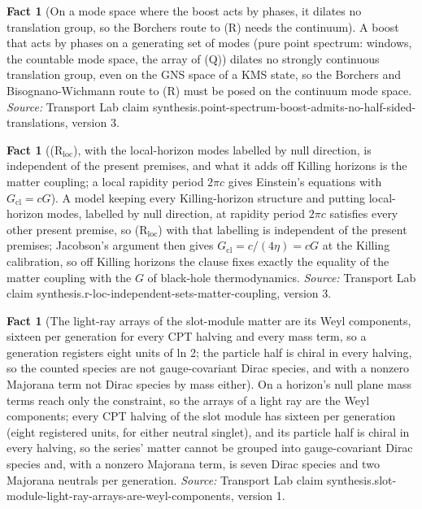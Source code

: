 \documentclass[11pt]{article}
\theoremstyle{definition}
\newtheorem{fact}[theorem]{Fact}
\theoremstyle{plain}
\begin{document}
\begin{fact}[On a mode space where the boost acts by phases, it dilates no translation group, so the Borchers route to (R) needs the continuum]\label{c:synthesis.point-spectrum-boost-admits-no-half-sided-translations}
A boost that acts by phases on a generating set of modes (pure point spectrum: windows, the countable mode space, the array of (Q)) dilates no strongly continuous translation group, even on the GNS space of a KMS state, so the Borchers and Bisognano-Wichmann route to (R) must be posed on the continuum mode space.
\emph{Source:} Transport Lab claim synthesis.point-spectrum-boost-admits-no-half-sided-translations, version 3.
\end{fact}

\begin{fact}[(R$_{\mathrm{loc}}$), with the local-horizon modes labelled by null direction, is independent of the present premises, and what it adds off Killing horizons is the matter coupling; a local rapidity period $2\pi c$ gives Einstein's equations with $G_{\mathrm{cl}} = cG$]\label{c:synthesis.r-loc-independent-sets-matter-coupling}
A model keeping every Killing-horizon structure and putting local-horizon modes, labelled by null direction, at rapidity period $2\pi c$ satisfies every other present premise, so (R$_{\mathrm{loc}}$) with that labelling is independent of the present premises; Jacobson's argument then gives $G_{\mathrm{cl}} = c/(4\eta) = cG$ at the Killing calibration, so off Killing horizons the clause fixes exactly the equality of the matter coupling with the $G$ of black-hole thermodynamics.
\emph{Source:} Transport Lab claim synthesis.r-loc-independent-sets-matter-coupling, version 3.
\end{fact}

\begin{fact}[The light-ray arrays of the slot-module matter are its Weyl components, sixteen per generation for every CPT halving and every mass term, so a generation registers eight units of ln 2; the particle half is chiral in every halving, so the counted species are not gauge-covariant Dirac species, and with a nonzero Majorana term not Dirac species by mass either]\label{c:synthesis.slot-module-light-ray-arrays-are-weyl-components}
On a horizon's null plane mass terms reach only the constraint, so the arrays of a light ray are the Weyl components; every CPT halving of the slot module has sixteen per generation (eight registered units, for either neutral singlet), and its particle half is chiral in every halving, so the series' matter cannot be grouped into gauge-covariant Dirac species and, with a nonzero Majorana term, is seven Dirac species and two Majorana neutrals per generation.
\emph{Source:} Transport Lab claim synthesis.slot-module-light-ray-arrays-are-weyl-components, version 1.
\end{fact}
\end{document}
